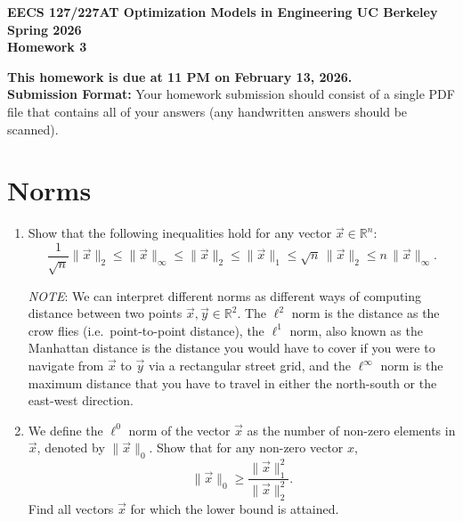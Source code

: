 \documentclass[10pt]{article}
\theoremstyle{definition}
\theoremstyle{plain}
\newcommand{\RR}{\mathbb{R}}
\begin{document}
\begin{center}
{\large\bfseries EECS 127/227AT \quad Optimization Models in Engineering \quad UC Berkeley \quad Spring 2026}\\[6pt]
{\LARGE\bfseries Homework 3}
\end{center}

\begin{tcolorbox}
\textbf{This homework is due at 11 PM on February 13, 2026.}\\[4pt]
\textbf{Submission Format:} Your homework submission should consist of a single PDF file that contains all of your answers (any handwritten answers should be scanned).
\end{tcolorbox}

\section{Norms}

\begin{enumerate}[label=(\alph*)]
\item Show that the following inequalities hold for any vector $\vec{x} \in \RR^n$:
\begin{equation}
\frac{1}{\sqrt{n}} \|\vec{x}\|_2 \leq \|\vec{x}\|_\infty \leq \|\vec{x}\|_2 \leq \|\vec{x}\|_1 \leq \sqrt{n}\, \|\vec{x}\|_2 \leq n\, \|\vec{x}\|_\infty.
\end{equation}

\textit{NOTE}: We can interpret different norms as different ways of computing distance between two points $\vec{x}, \vec{y} \in \RR^2$. The $\ell^2$ norm is the distance as the crow flies (i.e.\ point-to-point distance), the $\ell^1$ norm, also known as the Manhattan distance is the distance you would have to cover if you were to navigate from $\vec{x}$ to $\vec{y}$ via a rectangular street grid, and the $\ell^\infty$ norm is the maximum distance that you have to travel in either the north-south or the east-west direction.

\item We define the $\ell^0$ norm of the vector $\vec{x}$ as the number of non-zero elements in $\vec{x}$, denoted by $\|\vec{x}\|_0$. Show that for any non-zero vector $x$,
\begin{equation}
\|\vec{x}\|_0 \geq \frac{\|\vec{x}\|_1^2}{\|\vec{x}\|_2^2}.
\end{equation}
Find all vectors $\vec{x}$ for which the lower bound is attained.
\end{enumerate}
\end{document}
